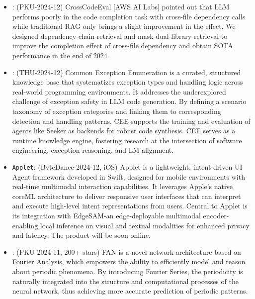 \documentclass[zh]{resume}
\begin{document}
\begin{itemize}
  \item {}: (PKU-2024-12) CrossCodeEval [AWS AI Labs] pointed out that LLM performs poorly in the code completion task with cross-file dependency calls while traditional RAG only brings a slight improvement in the effect. We designed dependency-chain-retrieval and mask-dual-library-retrieval to improve the completion effect of cross-file dependency and obtain SOTA performance in the end of 2024.
  \item {}: 
    (THU-2024-12) Common Exception Enumeration is a curated, structured knowledge base that systematizes exception types and handling logic across real-world programming environments. It addresses the underexplored challenge of exception safety in LLM code generation. By defining a scenario taxonomy of exception categories and linking them to corresponding detection and handling patterns, CEE supports the training and evaluation of agents like Seeker as backends for robust code synthesis. CEE serves as a runtime knowledge engine, fostering research at the intersection of software engineering, exception reasoning, and LM alignment.
  \item \texttt{Applet}:
    (ByteDance-2024-12, iOS) Applet is a lightweight, intent-driven UI Agent framework developed in Swift, designed for mobile environments with real-time multimodal interaction capabilities. It leverages Apple's native coreML architecture to deliver responsive user interfaces that can interpret and execute high-level intent representations from users. Central to Applet is its integration with EdgeSAM-an edge-deployable multimodal encoder-enabling local inference on visual and textual modalities for enhanced privacy and latency. The product will be soon online.
  \item {}:
    (PKU-2024-11, 200+ stars)
    FAN is a novel network architecture based on Fourier Analysis, which empowers the ability to efficiently model and reason about periodic phenomena. By introducing Fourier Series, the periodicity is naturally integrated into the structure and computational processes of the neural network, thus achieving more accurate prediction of periodic patterns. \\

\end{itemize}
\end{document}
